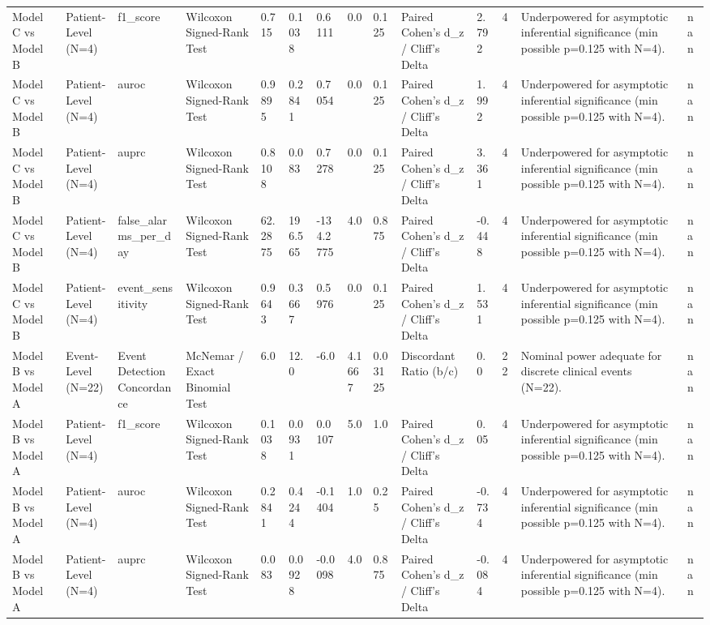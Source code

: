\begin{table}[t]
\begin{tabular}{llllllllllllll}
Model C vs Model B & Patient-Level (N=4) & f1\_score & Wilcoxon Signed-Rank Test & 0.715 & 0.1038 & 0.6111 & 0.0 & 0.125 & Paired Cohen's d\_z / Cliff's Delta & 2.792 & 4 & Underpowered for asymptotic inferential significance (min possible p=0.125 with N=4). & nan \\
Model C vs Model B & Patient-Level (N=4) & auroc & Wilcoxon Signed-Rank Test & 0.9895 & 0.2841 & 0.7054 & 0.0 & 0.125 & Paired Cohen's d\_z / Cliff's Delta & 1.992 & 4 & Underpowered for asymptotic inferential significance (min possible p=0.125 with N=4). & nan \\
Model C vs Model B & Patient-Level (N=4) & auprc & Wilcoxon Signed-Rank Test & 0.8108 & 0.083 & 0.7278 & 0.0 & 0.125 & Paired Cohen's d\_z / Cliff's Delta & 3.361 & 4 & Underpowered for asymptotic inferential significance (min possible p=0.125 with N=4). & nan \\
Model C vs Model B & Patient-Level (N=4) & false\_alarms\_per\_day & Wilcoxon Signed-Rank Test & 62.2875 & 196.565 & -134.2775 & 4.0 & 0.875 & Paired Cohen's d\_z / Cliff's Delta & -0.448 & 4 & Underpowered for asymptotic inferential significance (min possible p=0.125 with N=4). & nan \\
Model C vs Model B & Patient-Level (N=4) & event\_sensitivity & Wilcoxon Signed-Rank Test & 0.9643 & 0.3667 & 0.5976 & 0.0 & 0.125 & Paired Cohen's d\_z / Cliff's Delta & 1.531 & 4 & Underpowered for asymptotic inferential significance (min possible p=0.125 with N=4). & nan \\
Model B vs Model A & Event-Level (N=22) & Event Detection Concordance & McNemar / Exact Binomial Test & 6.0 & 12.0 & -6.0 & 4.1667 & 0.03125 & Discordant Ratio (b/c) & 0.0 & 22 & Nominal power adequate for discrete clinical events (N=22). & nan \\
Model B vs Model A & Patient-Level (N=4) & f1\_score & Wilcoxon Signed-Rank Test & 0.1038 & 0.0931 & 0.0107 & 5.0 & 1.0 & Paired Cohen's d\_z / Cliff's Delta & 0.05 & 4 & Underpowered for asymptotic inferential significance (min possible p=0.125 with N=4). & nan \\
Model B vs Model A & Patient-Level (N=4) & auroc & Wilcoxon Signed-Rank Test & 0.2841 & 0.4244 & -0.1404 & 1.0 & 0.25 & Paired Cohen's d\_z / Cliff's Delta & -0.734 & 4 & Underpowered for asymptotic inferential significance (min possible p=0.125 with N=4). & nan \\
Model B vs Model A & Patient-Level (N=4) & auprc & Wilcoxon Signed-Rank Test & 0.083 & 0.0928 & -0.0098 & 4.0 & 0.875 & Paired Cohen's d\_z / Cliff's Delta & -0.084 & 4 & Underpowered for asymptotic inferential significance (min possible p=0.125 with N=4). & nan \\

\end{tabular}
\end{table}
